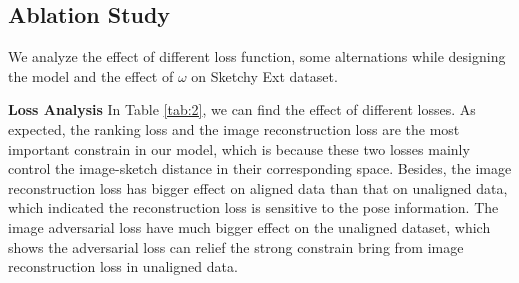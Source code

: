 \documentclass[10pt,twocolumn,letterpaper]{article}
\begin{document}
\begin{table}[]
\caption{Ablation Study on Sketchy Ext. moved $\mathcal{L}_{or}$ means that we move the orthogonality loss from ($f_{im}^{ap},f_{im}^{st}$) to ($z_{im}^{ap},f_{im}^{st}$); sk2im means we directly translate the image from the sketch structure feature and ignore the variational estimator.}
\label{tab:2}
\end{table}

\subsection{Ablation Study}
We analyze the effect of different loss function, some alternations while designing the model and the effect of $\omega$ on Sketchy Ext dataset.

\noindent\textbf{Loss Analysis}
In Table \ref{tab:2}, we can find the effect of different losses. As expected, the ranking loss and the image reconstruction loss are the most important constrain in our model, which is because these two losses mainly control the image-sketch distance in their corresponding space. Besides, the image reconstruction loss has bigger effect on aligned data than that on unaligned data, which indicated the reconstruction loss is sensitive to the pose information. The image adversarial loss have much bigger effect on the unaligned dataset, which shows the adversarial loss can relief the strong constrain bring from image reconstruction loss in unaligned data. 
\end{document}
